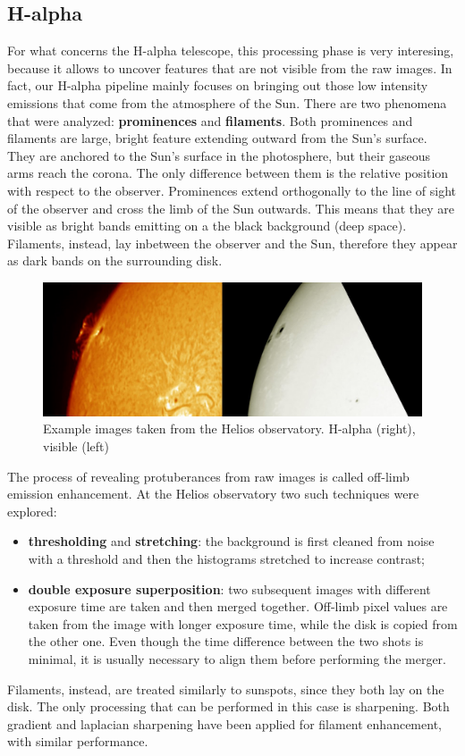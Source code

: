 \subsection{H-alpha}
For what concerns the H-alpha telescope, this processing phase is very interesing, because it allows to uncover features that are not visible from the raw images. In fact, our H-alpha pipeline mainly focuses on bringing out those low intensity emissions that come from the atmosphere of the Sun. There are two phenomena that were analyzed: \textbf{prominences} and \textbf{filaments}.
\bigbreak
\noindent Both prominences and filaments are large, bright feature extending outward from the Sun's surface. They are anchored to the Sun's surface in the photosphere, but their gaseous arms reach the corona. The only difference between them is the relative position with respect to the observer. Prominences extend orthogonally to the line of sight of the observer and cross the limb of the Sun outwards. This means that they are visible as bright bands emitting on a the black background (deep space). Filaments, instead, lay inbetween the observer and the Sun, therefore they appear as dark bands on the surrounding disk.
\bigbreak
\begin{figure}[t!]
    \centering
    \captionsetup{justification=centering}
    \includegraphics[width=\textwidth]{./pictures/sunsopt-flare}
    \caption{Example images taken from the Helios observatory. H-alpha (right), visible (left)}
    \label{fig:halpha-visible}
\end{figure}
\noindent The process of revealing protuberances from raw images is called off-limb emission enhancement. At the Helios observatory two such techniques were explored:
\begin{itemize}
  \item \textbf{thresholding} and \textbf{stretching}: the background is first cleaned from noise with a threshold and then the histograms stretched to increase contrast;
  \item \textbf{double exposure superposition}: two subsequent images with different exposure time are taken and then merged together. Off-limb pixel values are taken from the image with longer exposure time, while the disk is copied from the other one. Even though the time difference between the two shots is minimal, it is usually necessary to align them before performing the merger.
\end{itemize}
\bigbreak
\noindent Filaments, instead, are treated similarly to sunspots, since they both lay on the disk. The only processing that can be performed in this case is sharpening. Both gradient and laplacian sharpening have been applied for filament enhancement, with similar performance.
